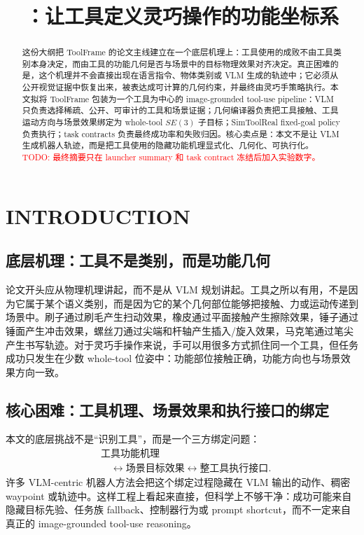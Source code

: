 \documentclass[letterpaper, 10 pt, conference]{ieeeconf}
\title{\LARGE \bf
\method{}：让工具定义灵巧操作的功能坐标系
}
\author{}
\newcommand{\method}{ToolFrame}
\newcommand{\todo}[1]{\textcolor{red}{TODO: #1}}
\begin{document}
\maketitle
\thispagestyle{empty}
\pagestyle{empty}

\begin{abstract}
这份大纲把 \method{} 的论文主线建立在一个底层机理上：工具使用的成败不由工具类别本身决定，而由工具的功能几何是否与场景中的目标物理效果对齐决定。真正困难的是，这个机理并不会直接出现在语言指令、物体类别或 VLM 生成的轨迹中；它必须从公开视觉证据中恢复出来，被表达成可计算的几何约束，并最终由灵巧手策略执行。本文拟将 \method{} 包装为一个工具为中心的 image-grounded tool-use pipeline：VLM 只负责选择稀疏、公开、可审计的工具和场景证据；几何编译器负责把工具接触、工具运动方向与场景效果绑定为 whole-tool $SE(3)$ 子目标；SimToolReal fixed-goal policy 负责执行；task contracts 负责最终成功率和失败归因。核心卖点是：本文不是让 VLM 生成机器人轨迹，而是把工具使用的隐藏功能机理显式化、几何化、可执行化。
\todo{最终摘要只在 launcher summary 和 task contract 冻结后加入实验数字。}
\end{abstract}

\section{INTRODUCTION}

\subsection{底层机理：工具不是类别，而是功能几何}
论文开头应从物理机理讲起，而不是从 VLM 规划讲起。工具之所以有用，不是因为它属于某个语义类别，而是因为它的某个几何部位能够把接触、力或运动传递到场景中。刷子通过刷毛产生扫动效果，橡皮通过平面接触产生擦除效果，锤子通过锤面产生冲击效果，螺丝刀通过尖端和杆轴产生插入/旋入效果，马克笔通过笔尖产生书写轨迹。对于灵巧手操作来说，手可以用很多方式抓住同一个工具，但任务成功只发生在少数 whole-tool 位姿中：功能部位接触正确，功能方向也与场景效果方向一致。

\subsection{核心困难：工具机理、场景效果和执行接口的绑定}
本文的底层挑战不是“识别工具”，而是一个三方绑定问题：
\begin{equation}
  \begin{aligned}
  &\text{工具功能机理}\\
  &\quad \longleftrightarrow \text{场景目标效果}
  \longleftrightarrow \text{整工具执行接口}.
  \end{aligned}
\end{equation}
许多 VLM-centric 机器人方法会把这个绑定过程隐藏在 VLM 输出的动作、稠密 waypoint 或轨迹中。这样工程上看起来直接，但科学上不够干净：成功可能来自隐藏目标先验、任务族 fallback、控制器行为或 prompt shortcut，而不一定来自真正的 image-grounded tool-use reasoning。
\end{document}
